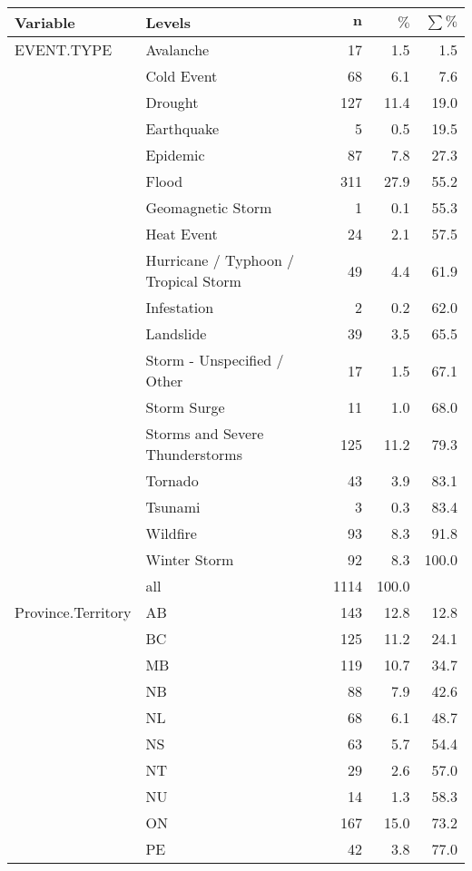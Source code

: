 \begingroup\footnotesize
\begin{longtable}{ll|rrr}
 \textbf{Variable} & \textbf{Levels} & $\mathbf{n}$ & $\mathbf{\%}$ & $\mathbf{\sum \%}$ \\ 
  \hline
EVENT.TYPE & Avalanche & 17 & 1.5 & 1.5 \\ 
   & Cold Event & 68 & 6.1 & 7.6 \\ 
   & Drought & 127 & 11.4 & 19.0 \\ 
   & Earthquake & 5 & 0.5 & 19.5 \\ 
   & Epidemic & 87 & 7.8 & 27.3 \\ 
   & Flood & 311 & 27.9 & 55.2 \\ 
   & Geomagnetic Storm & 1 & 0.1 & 55.3 \\ 
   & Heat Event & 24 & 2.1 & 57.5 \\ 
   & Hurricane / Typhoon / Tropical Storm & 49 & 4.4 & 61.9 \\ 
   & Infestation & 2 & 0.2 & 62.0 \\ 
   & Landslide & 39 & 3.5 & 65.5 \\ 
   & Storm - Unspecified / Other & 17 & 1.5 & 67.1 \\ 
   & Storm Surge & 11 & 1.0 & 68.0 \\ 
   & Storms and Severe Thunderstorms & 125 & 11.2 & 79.3 \\ 
   & Tornado & 43 & 3.9 & 83.1 \\ 
   & Tsunami & 3 & 0.3 & 83.4 \\ 
   & Wildfire & 93 & 8.3 & 91.8 \\ 
   & Winter Storm & 92 & 8.3 & 100.0 \\ 
   \hline
 & all & 1114 & 100.0 &  \\ 
   \hline
\hline
Province.Territory & AB & 143 & 12.8 & 12.8 \\ 
   & BC & 125 & 11.2 & 24.1 \\ 
   & MB & 119 & 10.7 & 34.7 \\ 
   & NB & 88 & 7.9 & 42.6 \\ 
   & NL & 68 & 6.1 & 48.7 \\ 
   & NS & 63 & 5.7 & 54.4 \\ 
   & NT & 29 & 2.6 & 57.0 \\ 
   & NU & 14 & 1.3 & 58.3 \\ 
   & ON & 167 & 15.0 & 73.2 \\ 
   & PE & 42 & 3.8 & 77.0 \\ 

\end{longtable}
